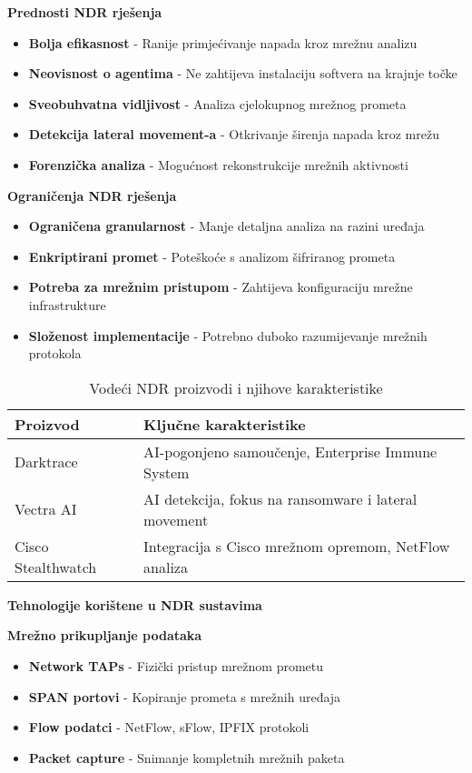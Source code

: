 \textbf{Prednosti NDR rješenja}

\begin{itemize}
\item \textbf{Bolja efikasnost} - Ranije primjećivanje napada kroz mrežnu analizu
\item \textbf{Neovisnost o agentima} - Ne zahtijeva instalaciju softvera na krajnje točke
\item \textbf{Sveobuhvatna vidljivost} - Analiza cjelokupnog mrežnog prometa
\item \textbf{Detekcija lateral movement-a} - Otkrivanje širenja napada kroz mrežu
\item \textbf{Forenzička analiza} - Mogućnost rekonstrukcije mrežnih aktivnosti
\end{itemize}

\textbf{Ograničenja NDR rješenja}

\begin{itemize}
\item \textbf{Ograničena granularnost} - Manje detaljna analiza na razini uređaja
\item \textbf{Enkriptirani promet} - Poteškoće s analizom šifriranog prometa
\item \textbf{Potreba za mrežnim pristupom} - Zahtijeva konfiguraciju mrežne infrastrukture
\item \textbf{Složenost implementacije} - Potrebno duboko razumijevanje mrežnih protokola
\end{itemize}

\begin{table}[h]
\centering
\begin{tabular}{|l|p{8cm}|}
\hline
\textbf{Proizvod} & \textbf{Ključne karakteristike} \\
\hline
Darktrace & AI-pogonjeno samoučenje, Enterprise Immune System \\
\hline
Vectra AI & AI detekcija, fokus na ransomware i lateral movement \\
\hline
Cisco Stealthwatch & Integracija s Cisco mrežnom opremom, NetFlow analiza \\
\hline
\end{tabular}
\caption{Vodeći NDR proizvodi i njihove karakteristike}
\end{table}

\textbf{Tehnologije korištene u NDR sustavima}

\textbf{Mrežno prikupljanje podataka}
\begin{itemize}
\item \textbf{Network TAPs} - Fizički pristup mrežnom prometu
\item \textbf{SPAN portovi} - Kopiranje prometa s mrežnih uređaja
\item \textbf{Flow podatci} - NetFlow, sFlow, IPFIX protokoli
\item \textbf{Packet capture} - Snimanje kompletnih mrežnih paketa
\end{itemize}

